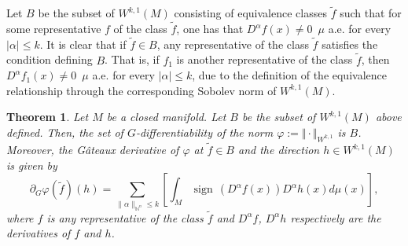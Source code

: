 \documentclass[a4paper,12pt,reqno]{amsart}%
\newtheorem{theorem}{Theorem}
\theoremstyle{definition}
\numberwithin{equation}{section}
\numberwithin{theorem}{section}
\newcommand{\beq}{\begin{equation}}
\newcommand{\eq}{\end{equation}}
\DeclareMathOperator*{\sign}{sign\,}
\begin{document}
Let $B$ be the subset of $W^{k,1}(M)$ consisting of equivalence classes $\tilde{f}$ such that for some representative $f$ of the  class $\tilde{f}$, one has 
 that $D^{\alpha}f(x)\neq 0\,$ $\mu$ a.e. for every $|\alpha|\leq k$. It is clear  that if $\tilde{f}\in B$, any representative of the class $\tilde{f}$ satisfies the condition defining $B$. That is, if $f_1$ is another representative of the class $\tilde{f}$, then  $D^{\alpha}f_1(x)\neq 0\,$ $\mu$ a.e. for every $|\alpha|\leq k$, due to the definition of the equivalence relationship through the corresponding Sobolev norm of $W^{k,1}(M)$.
\begin{theorem}\label{main1a} Let $M$ be a closed manifold. Let $B$ be the subset of $W^{k,1}(M)$ above defined. Then, the set of $G$-differentiability of the norm $\varphi:=\Vert\cdot\Vert_{W^{k,1}}$ is $B$. Moreover, the G\^ateaux derivative of  $\varphi$ at  $\tilde{f}\in B$ and the direction $h\in W^{k,1}(M)$ is given by 
	\beq\partial_{G}\varphi(\tilde{f})(h)=\sum_{\|\alpha\|_{\mathbb{N}^{n}}\leq k}\left[ \int_{M  } \sign(D^{\alpha}f(x))D^{\alpha}h(x)d\mu(x)\right] ,\label{Gder67}\eq
where $f$ is any representative of the class  $\tilde{f}$ and $D^{\alpha}f$, $D^{\alpha}h$ respectively are the derivatives of $f$ and $h$. 
	\end{theorem}
\end{document}
